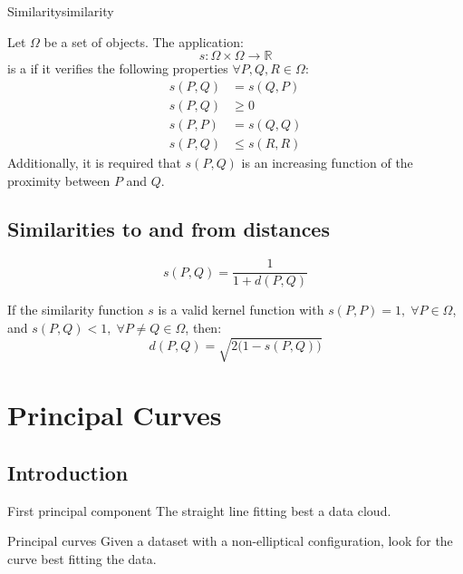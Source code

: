 \begin{definition}{Similarity}{similarity}

	Let $\Omega$ be a set of objects. The application:
	\begin{equation*}
		s: \Omega \times \Omega \to \mathds{R}
	\end{equation*}
	is a  if it verifies the following properties $\forall P, Q, R \in \Omega$:
	\begin{align*}
		s(P, Q) & = s(Q, P) \tag{symmetry}    \\
		s(P, Q) & \geq 0 \tag{non-negativity} \\
		s(P, P) & = s(Q, Q)                   \\
		s(P, Q) & \leq s(R, R)
	\end{align*}
	Additionally, it is required that $s(P, Q)$ is an increasing function of
	the proximity between $P$ and $Q$.
\end{definition}

\subsection{Similarities to and from distances}
\begin{equation*}
	s(P, Q) = \frac{1}{1 + d(P, Q)}
\end{equation*}

If the similarity function $s$ is a valid kernel function with $s(P, P) = 1,\;\forall P\in\Omega$,
and $s(P, Q) < 1,\;\forall P \neq Q \in \Omega$, then:
\begin{equation*}
	d(P, Q) = \sqrt{2\bigl(1 - s(P, Q)\bigr)}
\end{equation*}

\pagebreak
\section{Principal Curves}

\subsection{Introduction}

\begin{definition}{First principal component}{}
	The straight line fitting best a data cloud.
\end{definition}

\begin{problem}{Principal curves}{}
Given a dataset with a non-elliptical configuration,
look for the curve best fitting the data.
\end{problem}

